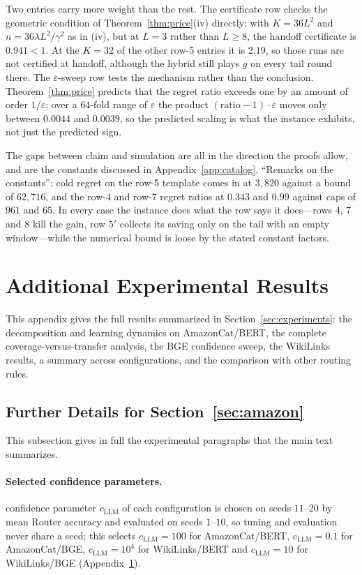 \documentclass[anon]{alt2027} %
\newcommand{\eps}{\varepsilon}
\begin{document}
Two entries carry more weight than the rest. The certificate row checks the
geometric condition of Theorem~\ref{thm:price}(iv) directly: with $K=36L^2$
and $n=36\lambda L^2/\gamma^2$ as in (iv), but at $L=3$ rather than $L\ge8$, the
handoff certificate is $0.941<1$. At the $K=32$ of the other row-5 entries it
is $2.19$, so those runs are not certified at handoff, although the hybrid
still plays $g$ on every tail round there. The $\eps$-sweep row tests the
mechanism rather than the conclusion. Theorem~\ref{thm:price} predicts that
the regret ratio exceeds one by an amount of order $1/\eps$; over a $64$-fold
range of $\eps$ the product $(\text{ratio}-1)\cdot\eps$ moves only between
$0.0044$ and $0.0039$, so the predicted scaling is what the instance exhibits,
not just the predicted sign.

The gaps between claim and simulation are all in the direction the proofs
allow, and are the constants discussed in
Appendix~\ref{app:catalog}, ``Remarks on the constants'': cold regret on the
row-5 template comes in at $3{,}820$ against a bound of $62{,}716$, and the
row-4 and row-7 regret ratios at $0.343$ and $0.99$ against caps of $961$ and
$65$. In every case the instance does what the row says it does---rows 4, 7
and 8 kill the gain, row $5'$ collects its saving only on the tail with
an empty window---while the numerical bound is loose by the stated constant
factors.

\section{Additional Experimental Results}
\label{app:more-exp}

This appendix gives the full results summarized in Section~\ref{sec:experiments}:
the decomposition and learning dynamics on AmazonCat/BERT, the complete
coverage-versus-transfer analysis, the BGE confidence sweep, the WikiLinks
results, a summary across configurations, and the comparison with other
routing rules.

\subsection{Further Details for Section~\ref{sec:amazon}}
\label{app:main-details}

This subsection gives in full the experimental paragraphs that the main text summarizes.

\paragraph{Selected confidence parameters.} confidence parameter $c_{\mathrm{LLM}}$ of each configuration is chosen on seeds $11$--$20$
by mean Router accuracy and evaluated on seeds $1$--$10$, so tuning and
evaluation never share a seed; this selects $c_{\mathrm{LLM}}=100$ for AmazonCat/BERT,
$c_{\mathrm{LLM}}=0.1$ for AmazonCat/BGE, $c_{\mathrm{LLM}}=10^4$ for WikiLinks/BERT and
$c_{\mathrm{LLM}}=10$ for WikiLinks/BGE (Appendix~\ref{app:more-exp}).
\end{document}
